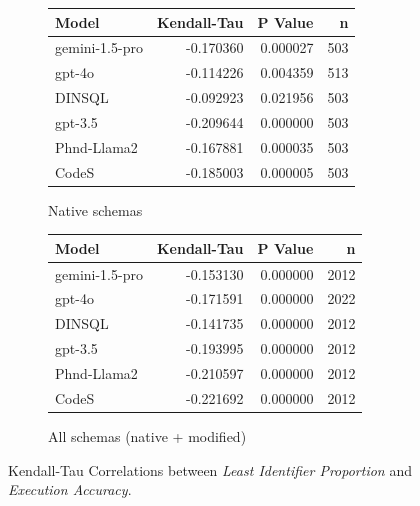 \begin{figure}
  \centering
  \begin{subfigure}{.5\linewidth}
      \centering
      \begin{tabular}{lrrr}
\toprule
Model & Kendall-Tau & P Value & n \\
\midrule
gemini-1.5-pro & -0.170360 & 0.000027 & 503 \\
gpt-4o & -0.114226 & 0.004359 & 513 \\
DINSQL & -0.092923 & 0.021956 & 503 \\
gpt-3.5 & -0.209644 & 0.000000 & 503 \\
Phnd-Llama2 & -0.167881 & 0.000035 & 503 \\
CodeS & -0.185003 & 0.000005 & 503 \\
\bottomrule
\end{tabular}

      \caption{Native schemas}
      \label{table:natlow-manual-match-ktau-native}
  \end{subfigure}%
  \begin{subfigure}{.5\linewidth}
      \centering
      \begin{tabular}{lrrr}
\toprule
Model & Kendall-Tau & P Value & n \\
\midrule
gemini-1.5-pro & -0.153130 & 0.000000 & 2012 \\
gpt-4o & -0.171591 & 0.000000 & 2022 \\
DINSQL & -0.141735 & 0.000000 & 2012 \\
gpt-3.5 & -0.193995 & 0.000000 & 2012 \\
Phnd-Llama2 & -0.210597 & 0.000000 & 2012 \\
CodeS & -0.221692 & 0.000000 & 2012 \\
\bottomrule
\end{tabular}

      \caption{All schemas (native + modified)}
      \label{table:natlow-manual-match-ktau-all}
  \end{subfigure}
  \caption{Kendall-Tau Correlations between \emph{Least Identifier Proportion} and \emph{Execution Accuracy}.}
\end{figure}

